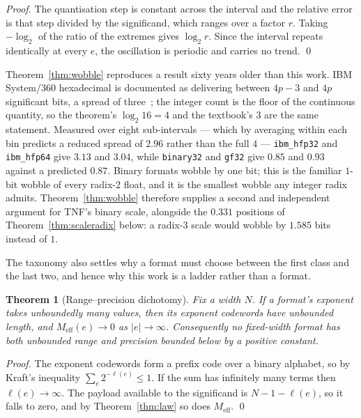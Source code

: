\documentclass[11pt]{article}
\newtheorem{theorem}{Theorem}
\theoremstyle{definition}
\begin{document}
\begin{proof}
The quantisation step is constant across the interval and the relative error is
that step divided by the significand, which ranges over a factor $r$. Taking
$-\log_2$ of the ratio of the extremes gives $\log_2 r$. Since the interval
repeats identically at every $e$, the oscillation is periodic and carries no
trend. \qed
\end{proof}

Theorem~\ref{thm:wobble} reproduces a result sixty years older than this work.
IBM System/360 hexadecimal is documented as delivering between $4p-3$ and $4p$
significant bits, a spread of three~\cite{goldberg1991,ibmhfp}; the integer count
is the floor of the continuous quantity, so the theorem's $\log_2 16 = 4$ and the
textbook's $3$ are the same statement. Measured over eight sub-intervals ---
which by averaging within each bin predicts a reduced spread of $2.96$ rather than
the full $4$ --- \texttt{ibm\_hfp32} and \texttt{ibm\_hfp64} give $3.13$ and
$3.04$, while \texttt{binary32} and \texttt{gf32} give $0.85$ and $0.93$ against a
predicted $0.87$. Binary formats wobble by one bit; this is the familiar
$1$-bit wobble of every radix-2 float, and it is the smallest wobble any integer
radix admits. Theorem~\ref{thm:wobble} therefore supplies a second and independent
argument for TNF's binary scale, alongside the $0.331$ positions of
Theorem~\ref{thm:scaleradix} below: a radix-3 scale would wobble by $1.585$ bits
instead of $1$.

The taxonomy also settles why a format must choose between the first class and the
last two, and hence why this work is a ladder rather than a format.

\begin{theorem}[Range--precision dichotomy]
\label{thm:dichotomy}
Fix a width $N$. If a format's exponent takes unboundedly many values, then its
exponent codewords have unbounded length, and
$M_{\mathrm{eff}}(e)\to0$ as $|e|\to\infty$. Consequently no fixed-width format
has both unbounded range and precision bounded below by a positive constant.
\end{theorem}

\begin{proof}
The exponent codewords form a prefix code over a binary alphabet, so by Kraft's
inequality $\sum_{e} 2^{-\ell(e)} \leq 1$. If the sum has infinitely many terms
then $\ell(e) \to \infty$. The payload available to the significand is
$N - 1 - \ell(e)$, so it falls to zero, and by Theorem~\ref{thm:law} so does
$M_{\mathrm{eff}}$. \qed
\end{proof}
\end{document}
